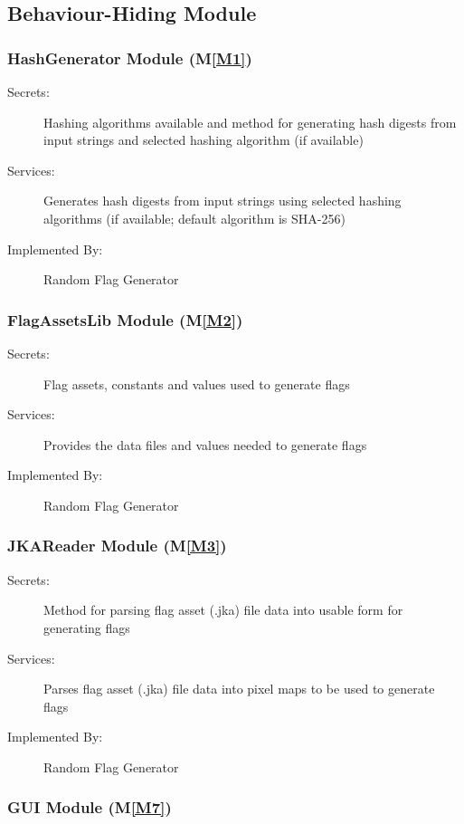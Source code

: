 \documentclass[12pt, titlepage]{article}
\newcommand{\mref}[1]{M\ref{#1}}
\begin{document}
\subsection{Behaviour-Hiding Module}

\subsubsection{HashGenerator Module (\mref{M1})}

\begin{description}
\item[Secrets:] Hashing algorithms available and method for generating hash
  digests from input strings and selected hashing algorithm (if available)
\item[Services:] Generates hash digests from input strings using selected
  hashing algorithms (if available; default algorithm is SHA-256)
\item[Implemented By:] Random Flag Generator
\end{description}

\subsubsection{FlagAssetsLib Module (\mref{M2})}

\begin{description}
\item[Secrets:] Flag assets, constants and values used to generate flags
\item[Services:] Provides the data files and values needed to generate flags
\item[Implemented By:] Random Flag Generator
\end{description}

\subsubsection{JKAReader Module (\mref{M3})}

\begin{description}
\item[Secrets:] Method for parsing flag asset (.jka) file data into usable
  form for generating flags
\item[Services:] Parses flag asset (.jka) file data into pixel maps to be used
  to generate flags
\item[Implemented By:] Random Flag Generator
\end{description}

\subsubsection{GUI Module (\mref{M7})}
\end{document}
